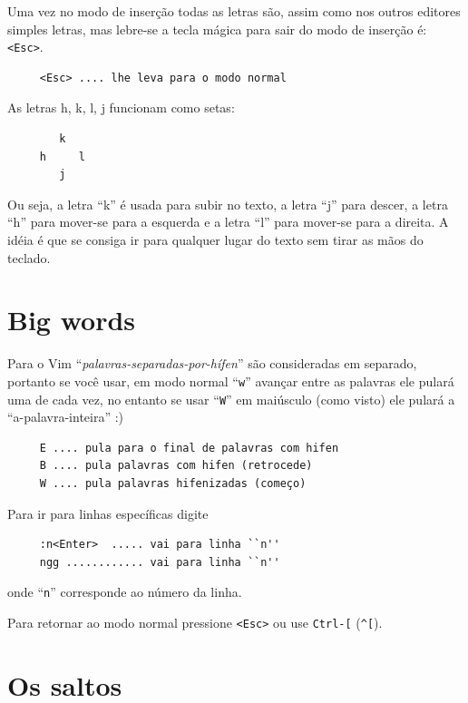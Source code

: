 \documentclass[10pt,a4paper,openany]{book}
\begin{document}
Uma vez no modo de inserção todas as letras são, assim como nos outros
editores simples letras, mas lebre-se a tecla mágica para sair do modo
de inserção é: \verb+<Esc>+.

\begin{verbatim}
     <Esc> .... lhe leva para o modo normal
\end{verbatim}

As letras h, k, l, j funcionam como setas:

\begin{verbatim}
        k
     h     l
        j
\end{verbatim}

Ou seja, a letra ``k'' é usada para subir no texto, a letra ``j'' para
descer, a letra ``h'' para mover-se para a esquerda e a letra ``l''
para mover-se para a direita. A idéia é que se consiga ir para
qualquer lugar do texto sem tirar as mãos do teclado.



\section{Big words}
\label{Big word's}

Para o Vim ``{\em{palavras-separadas-por-hífen}}'' são consideradas em separado, portanto se você usar,
em modo normal ``\verb+w+'' avançar entre as palavras ele pulará uma de
cada vez, no entanto se usar ``\verb+W+''
em maiúsculo (como visto) ele pulará a ``a-palavra-inteira'' :)

\begin{verbatim}
     E .... pula para o final de palavras com hifen
     B .... pula palavras com hifen (retrocede)
     W .... pula palavras hifenizadas (começo)
\end{verbatim}



Para ir para linhas específicas digite

\begin{verbatim}
     :n<Enter>  ..... vai para linha ``n''
     ngg ............ vai para linha ``n''
\end{verbatim}

onde ``\verb|n|'' corresponde ao número da linha.

Para retornar ao modo normal pressione \verb|<Esc>| ou use \verb|Ctrl-[|
(\verb|^[|).

\section{Os saltos}\label{Os saltos}
\end{document}
